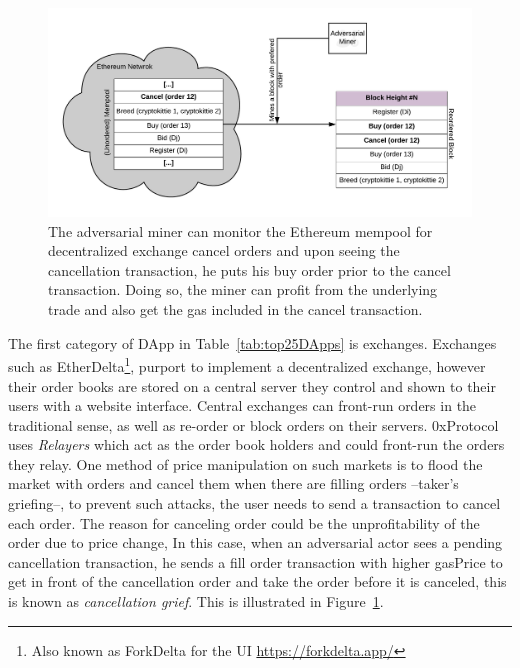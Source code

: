 


\begin{figure}[t]
\centering
\includegraphics[width=0.7\linewidth]{figures/Miner_reorder_frontrun.png}
\caption{\scriptsize The adversarial miner can monitor the Ethereum mempool for decentralized exchange cancel orders and upon seeing the cancellation transaction, he puts his buy order prior to the cancel transaction. Doing so, the miner can profit from the underlying trade and also get the gas included in the cancel transaction. \label{fig:MinerFrontrunning}} 
\end{figure}

The first category of DApp in Table~\ref{tab:top25DApps} is exchanges. Exchanges such as EtherDelta\footnote{Also known as ForkDelta for the UI \url{https://forkdelta.app/}}, purport to implement a decentralized exchange, however their order books are stored on a central server they control and shown to their users with a website interface. Central exchanges can front-run orders in the traditional sense, as well as re-order or block orders on their servers. 0xProtocol~\cite{warren20170x} uses \textit{Relayers} which act as the order book holders and could front-run the orders they relay. One method of price manipulation on such markets is to flood the market with orders and cancel them when there are filling orders --taker's griefing--, to prevent such attacks, the user needs to send a transaction to cancel each order. The reason for canceling order could be the unprofitability of the order due to price change, In this case, when an adversarial actor sees a pending  cancellation transaction, he sends a fill order transaction with higher gasPrice to get in front of the cancellation order and take the order before it is canceled, this is known as \textit{cancellation grief}. This is illustrated in Figure~\ref{fig:MinerFrontrunning}.

